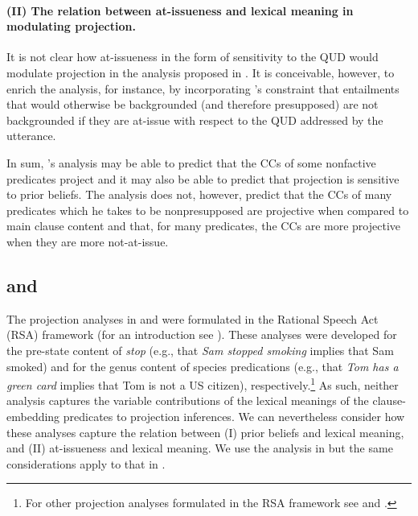 \documentclass[11pt,fleqn]{article}
\newcommand{\6}{\mbox{$[\hspace*{-.6mm}[$}}
\newcommand{\9}{\mbox{$]\hspace*{-.6mm}]$}}
\newcommand{\citepos}[1]{\citeauthor{#1}'s \citeyear{#1}}
\begin{document}
\paragraph{(II) The relation between at-issueness and lexical meaning in modulating projection.} It is not clear how at-issueness in the form of sensitivity to the QUD would modulate projection in the analysis proposed in \citealt{schlenker2021}. It is conceivable, however, to enrich the analysis, for instance, by incorporating \citepos{abrusan2011} constraint that entailments that would otherwise be backgrounded (and therefore presupposed) are not backgrounded if they are at-issue with respect to the QUD addressed by the utterance.

\bigskip

In sum, \citepos{schlenker2021} analysis may be able to predict that the CCs of some nonfactive predicates project and it may also be able to predict that projection is sensitive to prior beliefs. The analysis does not, however, predict that the CCs of many predicates which he takes to be nonpresupposed are projective when compared to main clause content and that, for many predicates, the CCs are more projective when they are more not-at-issue.

\subsection{\citealt{qing-etal2016} and \citealt{warstadt2022}}

The projection analyses in \citealt{qing-etal2016} and \citealt{warstadt2022} were formulated in the Rational Speech Act (RSA) framework (for an introduction see \citealt{degen2023-RSA}).  These analyses were developed for the pre-state content of {\em stop} (e.g., that {\em Sam stopped smoking} implies that Sam smoked) and for the genus content of species predications (e.g., that {\em Tom has a green card} implies that Tom is not a US citizen), respectively.\footnote{For other projection analyses formulated in the RSA framework see \citealt{stevens-etal2017} and \citealt{pan-degen2023}.} As such, neither analysis captures the variable contributions of the lexical meanings of the clause-embedding predicates to projection inferences. We can nevertheless consider how these analyses capture the relation between (I) prior beliefs and lexical meaning, and (II) at-issueness and lexical meaning. We use the analysis in \citealt{qing-etal2016} but the same considerations apply to that in \citealt{warstadt2022}.
\end{document}
